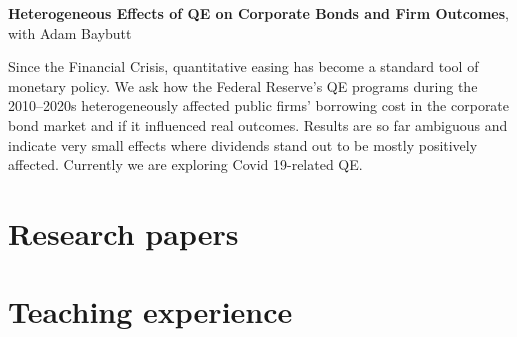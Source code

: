 \documentclass{clean_cv}
\begin{document}
\textbf{Heterogeneous Effects of QE on Corporate Bonds and Firm Outcomes}, with Adam Baybutt

Since the Financial Crisis, quantitative easing has become a standard tool of monetary policy. We ask how the Federal Reserve's QE programs during the 2010--2020s heterogeneously affected public firms' borrowing cost in the corporate bond market and if it influenced real outcomes. Results are so far ambiguous and indicate very small effects where dividends stand out to be mostly positively affected. Currently we are exploring Covid 19-related QE.


\section{Research papers}
\nocite{*}%
\begin{datetabular}{6em}
\end{datetabular}


\section{Teaching experience}
\begin{datetabular}{6em}
\end{datetabular}
\end{document}

